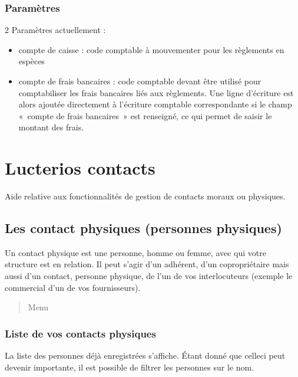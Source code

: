 \documentclass[a4paper,10pt,oneside,french]{sphinxmanual}
\begin{document}
\subsection{Paramètres}
\label{\detokenize{payoff/config:parametres}}
2 Paramètres actuellement :
\begin{itemize}
\item {} 
compte de caisse : code comptable à mouvementer pour les règlements en espèces

\item {} 
compte de frais bancaires : code comptable devant être utilisé pour comptabiliser les frais bancaires liés aux règlements. Une ligne d’écriture est alors ajoutée directement à l’écriture comptable correspondante si le champ « compte de frais bancaires » est renseigné, ce qui permet de saisir le montant des frais.

\end{itemize}


\chapter{Lucterios contacts}
\label{\detokenize{contacts/index:lucterios-contacts}}\label{\detokenize{contacts/index::doc}}
Aide relative aux fonctionnalités de gestion de contacts moraux ou physiques.


\section{Les contact physiques (personnes physiques)}
\label{\detokenize{contacts/individual:les-contact-physiques-personnes-physiques}}\label{\detokenize{contacts/individual::doc}}
Un contact physique est une personne, homme ou femme, avec qui votre structure est en relation. Il peut s’agir d’un adhérent, d’un copropriétaire mais aussi d’un contact, personne physique, de l’un de vos interlocuteurs (exemple le commercial d’un de vos fournisseurs).
\begin{quote}

Menu 
\end{quote}


\subsection{Liste de vos contacts physiques}
\label{\detokenize{contacts/individual:liste-de-vos-contacts-physiques}}
La liste des personnes déjà enregistrées s’affiche. Étant donné que celle\sphinxhyphen{}ci peut devenir importante, il est possible de filtrer les personnes sur le nom.
\end{document}
